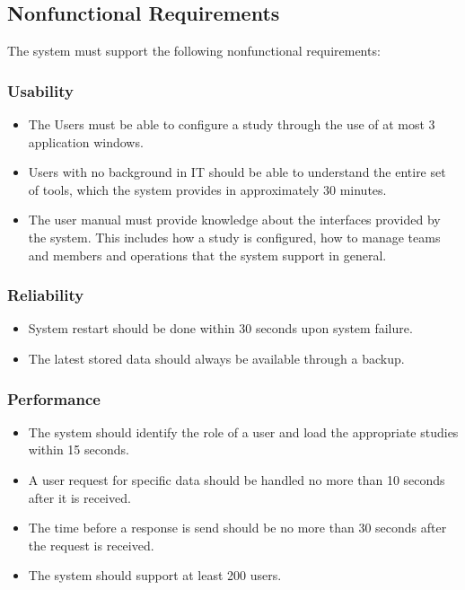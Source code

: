 \newpage

\subsection{Nonfunctional Requirements}
The system must support the following nonfunctional requirements:

\subsubsection{Usability}

\begin{itemize}
\item The Users must be able to configure a study through the use of at most 3 application windows.
\item Users with no background in IT should be able to understand the entire set of tools, which the system provides in approximately 30 minutes. 
\item The user manual must provide knowledge about the interfaces provided by the system. This includes how a study is configured, how to manage teams and members and operations that the system support in general. 
\end{itemize}

\subsubsection{Reliability}

\begin{itemize}
\item System restart should be done within 30 seconds upon system failure.
\item The latest stored data should always be available through a backup.
\end{itemize}

\subsubsection{Performance}

\begin{itemize}
\item The system should identify the role of a user and load the appropriate studies within 15 seconds.
\item A user request for specific data should be handled no more than 10 seconds after it is received.
\item The time before a response is send should be no more than 30 seconds after the request is received.
\item The system should support at least 200 users.
\end{itemize}

